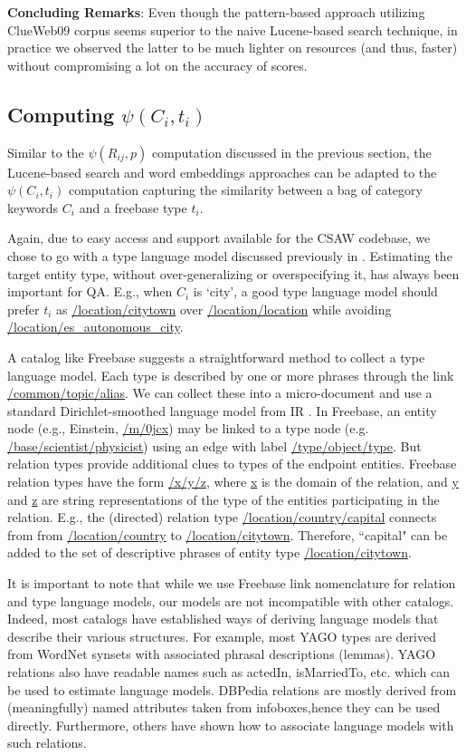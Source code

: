 \documentclass[a4paper, twoside, 12pt]{report}
\begin{document}
\textbf{Concluding Remarks}: Even though the pattern-based approach utilizing ClueWeb09 corpus seems superior to the naive Lucene-based search technique, in practice we observed the latter to be much lighter on resources (and thus, faster) without compromising a lot on the accuracy of scores.

\subsection{Computing $\psi(C_i, t_i)$}
Similar to the $\psi(R_{ij},p)$ computation discussed in the previous section, the Lucene-based search and word embeddings approaches can be adapted to the $\psi(C_i, t_i)$ computation capturing the similarity between a bag of category keywords $C_i$ and a freebase type $t_i$.

Again, due to easy access and support available for the CSAW codebase, we chose to go with a type language model discussed previously in \cite{joshiknowledge}. 
Estimating the target entity type, without over-generalizing or overspecifying it, has always been important for QA. E.g., when $C_i$ is `city', a good type language model should prefer $t_i$ as \url{/location/citytown} over \url{/location/location} while avoiding \url{/location/es_autonomous_city}.

A catalog like Freebase suggests a straightforward method to collect a type language model. Each type is described by one or more phrases through the link \url{/common/topic/alias}. We
can collect these into a micro-document and use a standard Dirichlet-smoothed language model from IR \cite{zhai2008statistical}. In Freebase, an entity node (e.g., Einstein, \url{/m/0jcx}) may be linked to a type node (e.g. \url{/base/scientist/physicist}) using an edge with label \url{/type/object/type}. But relation types provide additional clues to types of the endpoint entities. Freebase relation types have the form \url{/x/y/z}, where \url{x} is the domain of the relation, and \url{y} and \url{z} are string representations of the type of the entities participating in the relation. E.g., the (directed) relation
type \url{/location/country/capital} connects from from \url{/location/country} to \url{/location/citytown}. Therefore, ``capital" can be added to the set of descriptive phrases of entity type \url{/location/citytown}. 

It is important to note that while we use Freebase link nomenclature for relation and type language models, our models are not incompatible with other catalogs. Indeed, most catalogs have established ways of deriving language models that describe their various structures. For example, most YAGO types are derived from WordNet synsets with associated phrasal descriptions (lemmas). YAGO relations also have readable names such as actedIn, isMarriedTo, etc. which can be used to estimate language models. DBPedia relations are mostly derived from (meaningfully) named attributes taken from infoboxes,hence they can be used directly. Furthermore, others \cite{wu2007autonomously} have shown how to associate language models with such relations.
\end{document}
